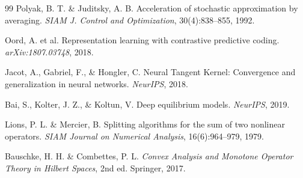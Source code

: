 \documentclass[12pt,a4paper]{ctexart}
\theoremstyle{definition}
\theoremstyle{remark}
\begin{document}
\begin{thebibliography}{99}
 Polyak, B. T. \& Juditsky, A. B. Acceleration of stochastic approximation by averaging. \textit{SIAM J. Control and Optimization}, 30(4):838–855, 1992.

 Oord, A. et al. Representation learning with contrastive predictive coding. \textit{arXiv:1807.03748}, 2018.

 Jacot, A., Gabriel, F., \& Hongler, C. Neural Tangent Kernel: Convergence and generalization in neural networks. \textit{NeurIPS}, 2018.

 Bai, S., Kolter, J. Z., \& Koltun, V. Deep equilibrium models. \textit{NeurIPS}, 2019.

 Lions, P. L. \& Mercier, B. Splitting algorithms for the sum of two nonlinear operators. \textit{SIAM Journal on Numerical Analysis}, 16(6):964–979, 1979.

 Bauschke, H. H. \& Combettes, P. L. \textit{Convex Analysis and Monotone Operator Theory in Hilbert Spaces}, 2nd ed. Springer, 2017.

\end{thebibliography}
\end{document}
